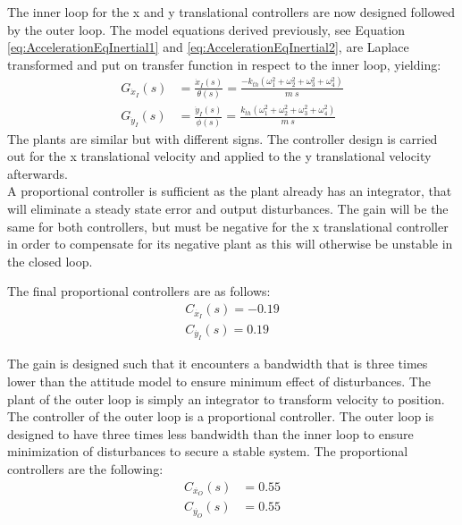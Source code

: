 The inner loop for the x and y translational controllers are now designed followed by the outer loop.
The model equations derived previously, see Equation \ref{eq:AccelerationEqInertial1} and \ref{eq:AccelerationEqInertial2}, are Laplace transformed and put on transfer function in respect to the inner loop, yielding:
\begin{align}
    G_{\dot{x}_I}(s)&=\frac{\dot{x}_I (s)}{\theta (s)}=\frac{-k_{th} (\omega_1 ^2 + \omega_2 ^2 + \omega_3 ^2 + \omega_4 ^2)}{m\ s} \\
    G_{\dot{y}_I}(s)&=\frac{\dot{y}_I (s)}{\phi (s)}=\frac{k_{th}(\omega_1 ^2 + \omega_2 ^2 + \omega_3 ^2 + \omega_4 ^2)}{m\ s} 
\end{align}
%
The plants are similar but with different signs. The controller design is carried out for the x translational velocity and applied to the y translational velocity afterwards.\\
A proportional controller is sufficient as the plant already has an integrator, that will eliminate a steady state error and output disturbances. The gain will be the same for both controllers, but must be negative for the x translational controller in order to compensate for its negative plant as this will otherwise be unstable in the closed loop.

The final proportional controllers are as follows:
\begin{align}
C_{\dot{x_I}}(s)= -0.19\\
C_{\dot{y_I}}(s)= 0.19
\end{align}

The gain is designed such that it encounters a bandwidth that is three times lower than the attitude model to ensure minimum effect of disturbances.
The plant of the outer loop is simply an integrator to transform velocity to position. The controller of the outer loop is a proportional controller. The outer loop is designed to have three times less bandwidth than the inner loop to ensure minimization of disturbances to secure a stable system.
The proportional controllers are the following:
\begin{align}
C_{\dot{x_O}}(s)&= 0.55\\
C_{\dot{y_O}}(s)&= 0.55
\end{align}


